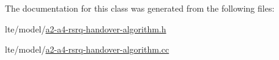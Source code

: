 The documentation for this class was generated from the following files\+:\begin{DoxyCompactItemize}
\item 
lte/model/\hyperlink{a2-a4-rsrq-handover-algorithm_8h}{a2-\/a4-\/rsrq-\/handover-\/algorithm.\+h}\item 
lte/model/\hyperlink{a2-a4-rsrq-handover-algorithm_8cc}{a2-\/a4-\/rsrq-\/handover-\/algorithm.\+cc}\end{DoxyCompactItemize}
